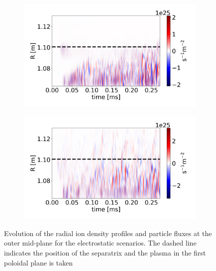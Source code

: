 \begin{figure}[H]
\begin{subfigure}[t]{0.45\textwidth}
	\end{subfigure}
	\begin{subfigure}[t]{0.45\textwidth}
		\centering
		\includegraphics[width=1\textwidth]{schemes/plotOMPtime_spec1_fluxn_psi_PHI.jpg}
	\end{subfigure}
	\begin{subfigure}[t]{0.45\textwidth}
		\centering
		\includegraphics[width=1\textwidth]{schemes/plotOMPtime_spec1_fluxn_psi_PHIJ_mass_1.jpg}
	\end{subfigure}
	\caption{Evolution of the radial ion density profiles and particle fluxes at the outer mid-plane for the electrostatic scenarios. The dashed line indicates the position of the separatrix and the plasma in the first poloidal plane is taken}
	\label{fig:CIRC_EI_OMPevolution_n}
\end{figure}

